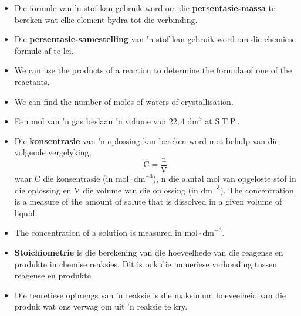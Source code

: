 \begin{itemize}[noitemsep]
\item Die formule van 'n stof kan gebruik word om die \textbf{persentasie-massa} te bereken wat elke element bydra tot die verbinding.
\item Die \textbf{persentasie-samestelling} van 'n stof kan gebruik word om die chemiese formule af te lei.
\item We can use the products of a reaction to determine the formula of one of the reactants. 
\item We can find the number of moles of waters of crystallisation.
\item Een mol van 'n gas beslaan 'n volume van $22,4 {\text{ dm}}^{3}$ at S.T.P..
\item Die \textbf{konsentrasie} van 'n oplossing kan bereken word met behulp van die volgende vergelyking,
\label{m38712*id286019}\nopagebreak\noindent{}
    \begin{equation*}
    \text{C}=\frac{\text{n}}{\text{V}}
      \end{equation*}
waar C die konsentrasie (in $\text{mol} \cdot {\text{dm}}^{-3}$), n die aantal mol van opgeloste stof in die oplossing en V die volume van die oplossing (in ${\text{dm}}^{-3}$). The concentration is a measure of the amount of solute that is dissolved in a given volume of liquid.
\item The concentration of a solution is measured in $\text{mol} \cdot {\text{dm}}^{-3}$.
\item \textbf{Stoichiometrie} is die berekening van die hoeveelhede van die reagense en produkte in  chemise reaksies. Dit is ook die numeriese verhouding tussen reagense en produkte.
\item Die teoretiese opbrengs van 'n reaksie is die maksimum hoeveelheid van die produk wat ons verwag om uit 'n reaksie te kry.\end{itemize}
\label{m38712*secfhsst!!!underscore!!!id2334}
